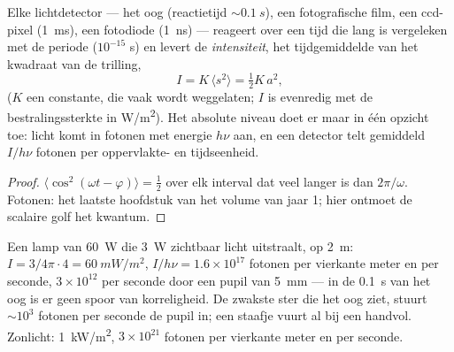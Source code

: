 \begin{proposition}\label{prop:b2:scalar-light-model:intensity}
Elke lichtdetector --- het oog (reactietijd $\sim\qty{0.1}{s}$), een
fotografische film, een ccd-pixel (\qty{1}{ms}), een fotodiode (\qty{1}{ns})
--- reageert over een tijd die lang is vergeleken met de periode ($10^{-15}$
s) en levert de \emph{intensiteit}, het tijdgemiddelde van het kwadraat van
de trilling,
\[
I = K\,\langle s^2\rangle = \tfrac12K\,a^2 ,
\]
($K$ een constante, die vaak wordt weggelaten; $I$ is evenredig met de
bestralingssterkte in \unit{W/m^2}). Het absolute niveau doet er maar in één
opzicht toe: licht komt in fotonen met energie $h\nu$ aan, en een detector
telt gemiddeld $I/h\nu$ fotonen per oppervlakte- en tijdseenheid.
\end{proposition}

\begin{proof}
$\langle\cos^2(\omega t - \varphi)\rangle = \tfrac12$ over elk interval dat
veel langer is dan $2\pi/\omega$. Fotonen: het laatste hoofdstuk van het
volume van jaar 1; hier ontmoet de scalaire golf het kwantum.
\end{proof}

\begin{example}[Ordegrootten]\label{ex:b2:scalar-light-model:orders}
Een lamp van \qty{60}{W} die \qty{3}{W} zichtbaar licht uitstraalt, op
\qty{2}{m}: $I = 3/4\pi\cdot4 = \qty{60}{mW/m^2}$,
$I/h\nu = 1.6 \times 10^{17}$ fotonen per vierkante meter en per seconde,
$3 \times 10^{12}$ per seconde door een pupil van \qty{5}{mm} --- in de
\qty{0.1}{s} van het oog is er geen spoor van korreligheid. De zwakste ster
die het oog ziet, stuurt $\sim 10^3$ fotonen per seconde de pupil in; een
staafje vuurt al bij een handvol. Zonlicht: \qty{1}{kW/m^2},
$3 \times 10^{21}$ fotonen per vierkante meter en per seconde.
\end{example}

